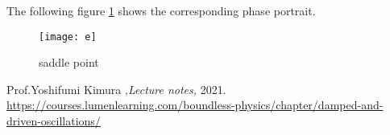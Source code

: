 \documentclass[12pt,a4paper]{article}
\begin{document}
The following figure \ref{fig 5} shows the corresponding phase portrait.

\begin{figure}[H]
\texttt{[image: e]}
\centering
\caption{saddle point}
\label{fig 5}
\end{figure}

\newpage
\begin{thebibliography}{99}

   Prof.Yoshifumi Kimura  ,{\em Lecture notes,}  2021.\\
   \url{https://courses.lumenlearning.com/boundless-physics/chapter/damped-and-driven-oscillations/} 


\end{thebibliography}
\end{document}
